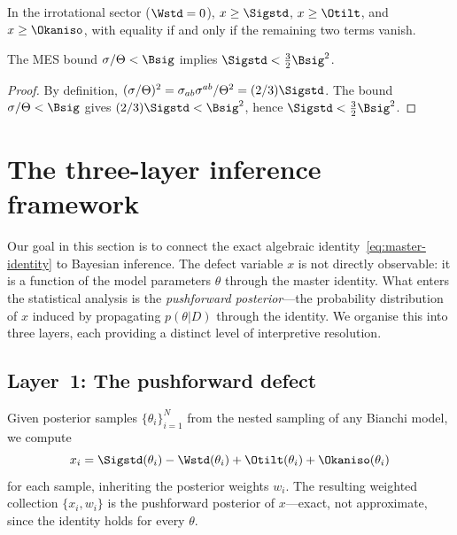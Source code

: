 \begin{corollary}
\label{cor:component-bounds}
In the irrotational sector ($\Wstd = 0$),
$x \geq \Sigstd$, $x \geq \Otilt$, and
$x \geq \Okaniso$, with equality if and only if the remaining
two terms vanish.
\end{corollary}

\begin{corollary}
\label{cor:sigma-from-Bsigma}
The MES bound $\sigma/\Theta < \Bsig$ implies
$\Sigstd < \frac{3}{2}\Bsig^2$.
\end{corollary}
\begin{proof}
By definition, $(\sigma/\Theta)^2
= \sigma_{ab}\sigma^{ab}/\Theta^2 = (2/3)\Sigstd$.
The bound $\sigma/\Theta < \Bsig$ gives
$(2/3)\Sigstd < \Bsig^2$, hence
$\Sigstd < \frac{3}{2}\Bsig^2$.
\end{proof}


\section{The three-layer inference framework}
\label{sec:three-layer}

Our goal in this section is to connect the exact algebraic
identity~\eqref{eq:master-identity} to Bayesian inference.  The
defect variable $x$ is not directly observable: it is a
function of the model parameters $\theta$ through the master
identity.  What enters the statistical analysis is the
\emph{pushforward posterior}---the probability distribution of
$x$ induced by propagating $p(\theta | D)$ through the identity.
We organise this into three layers, each providing a distinct
level of interpretive resolution.


\subsection{Layer~1: The pushforward defect}
\label{sec:layer1}

Given posterior samples $\{\theta_i\}_{i=1}^N$ from the nested
sampling of any Bianchi model, we compute
\begin{equation}\label{eq:xi-pushforward}
x_i = \Sigstd(\theta_i) - \Wstd(\theta_i)
      + \Otilt(\theta_i) + \Okaniso(\theta_i)
\end{equation}
for each sample, inheriting the posterior weights $w_i$.  The
resulting weighted collection $\{x_i, w_i\}$ is the pushforward
posterior of $x$---exact, not approximate, since the identity
holds for every $\theta$.

